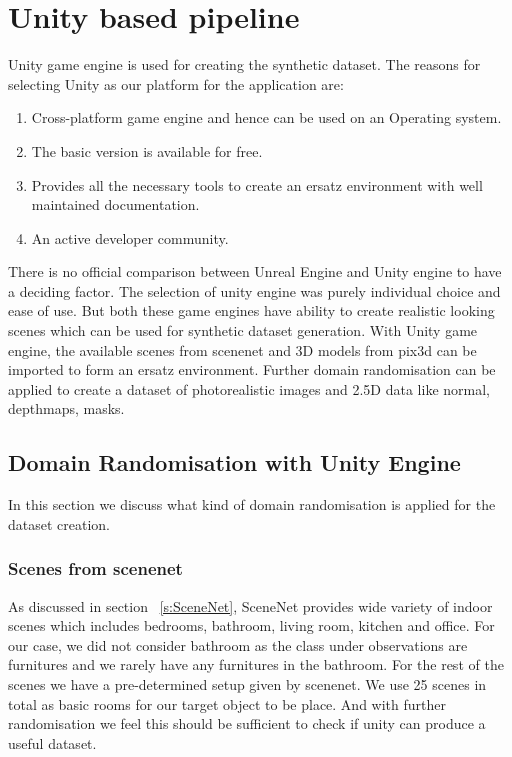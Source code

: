 \section{Unity based pipeline}\label{s:Unity Pipeline}
Unity game engine is used for creating the synthetic dataset.
The reasons for selecting Unity as our platform for the application are:
\begin{enumerate}
    \item Cross-platform game engine and hence can be used on an Operating system.
    \item The basic version is available for free.
    \item Provides all the necessary tools to create an ersatz environment with well maintained documentation.
    \item An active developer community.
\end{enumerate}

There is no official comparison between Unreal Engine and Unity engine to have a deciding factor.
The selection of unity engine was purely individual choice and ease of use.
But both these game engines have ability to create realistic looking scenes which can be used for synthetic dataset generation.
With Unity game engine, the available scenes from scenenet and 3D models from pix3d can be imported to form an ersatz environment.
Further domain randomisation can be applied to create a dataset of photorealistic images and 2.5D data like normal, depthmaps, masks.

\subsection{Domain Randomisation with Unity Engine}\label{s:Domain Randomisation with unity engine}
In this section we discuss what kind of domain randomisation is applied for the dataset creation.
\subsubsection{Scenes from scenenet}
As discussed in section ~\ref{s:SceneNet}, SceneNet provides wide variety of indoor scenes which includes bedrooms, bathroom, living room, kitchen and office.
For our case, we did not consider bathroom as the class under observations are furnitures and we rarely have any furnitures in the bathroom.
For the rest of the scenes we have a pre-determined setup given by scenenet. We use 25 scenes in total as basic rooms for our target object to be place.
And with further randomisation we feel this should be sufficient to check if unity can produce a useful dataset.

